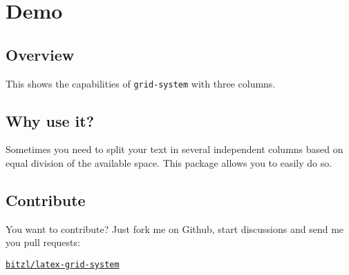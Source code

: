 \documentclass[DIV12]{scrartcl}
\begin{document}
\section{Demo}
\blindtext

\bigskip

\begin{row}[cellsep=0.5cm]{3}{3}
	\begin{cell}{1}
	\section*{Overview}
	\vspace{-1.5ex}
	This shows the capabilities of \texttt{grid-system} with three columns.
	\end{cell}
	\begin{cell}{1}
	\section*{Why use it?}
	\vspace{-1.5ex}
	Sometimes you need to split your text in several independent columns based on equal division of the available space. This package allows you to easily do so.
	\end{cell}
	\begin{cell}{1}
	\section*{Contribute}
	\vspace{-1.5ex}
	You want to contribute? Just fork me on Github, start discussions and send me you pull requests: %
	\begin{center}
	\href{https://github.com/bitzl/latex-grid-system}{\tt bitzl/latex-grid-system}
	\end{center}
	\end{cell}
\end{row}

\bigskip
\end{document}
